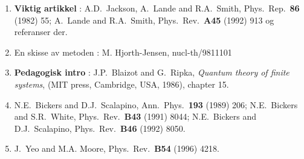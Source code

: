 \begin{enumerate}
\item {\bf Viktig artikkel} : A.D.\ Jackson, A.\ Lande and R.A.\ Smith, 
Phys.\ Rep.\  {\bf 86} (1982) 55; A.\ Lande and R.A.\ Smith, Phys.\ Rev.\ 
{\bf A45}
(1992) 913 og referanser der.
\item En skisse av metoden : M. Hjorth-Jensen,  nucl-th/9811101
\item {\bf Pedagogisk intro} : 
J.P.\ Blaizot and G.\ Ripka, {\em Quantum theory of finite systems},
(MIT press, Cambridge, USA, 1986), chapter 15.
\item 
N.E.\ Bickers and D.J.\ Scalapino, Ann.\ Phys.\ 
{\bf 193} (1989) 206;
N.E.\ Bickers and S.R.\ White, Phys.\ Rev.\ 
{\bf B43} (1991) 8044; 
N.E.\ Bickers and D.J.\ Scalapino, Phys.\ Rev.\
{\bf B46} (1992) 8050.
\item J.\ Yeo and M.A. Moore, Phys.\ Rev.\ 
{\bf B54} (1996) 4218.

\end{enumerate}





















